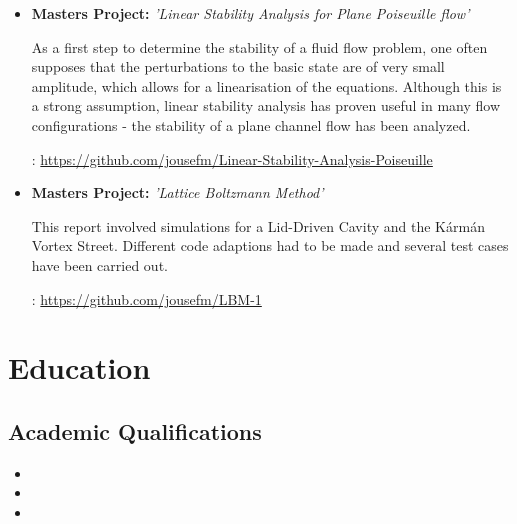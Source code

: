 \documentclass[11pt,a4paper,sans]{moderncv}        %
\begin{document}
\vspace{5pt}

\begin{itemize}

\item{\textbf{Masters Project:} \textit{'Linear Stability Analysis for Plane Poiseuille flow'}

\vspace{3pt}

\small{As a first step to determine the stability of a fluid flow problem, one often supposes that the perturbations to the basic state are of very small amplitude, which allows for a linearisation of the equations. Although this is a strong assumption, linear stability analysis has proven useful in many flow configurations - the stability of a plane channel flow has been analyzed.}} \newline

\faGithub : \url{https://github.com/jousefm/Linear-Stability-Analysis-Poiseuille} \newline

\item{\textbf{Masters Project:}} \textit{'Lattice Boltzmann Method'}

\vspace{3pt}

\small{This report involved simulations for a Lid-Driven Cavity and the Kármán Vortex Street. Different code adaptions had to be made and several test cases have been carried out. } \newline

\faGithub : \url{https://github.com/jousefm/LBM-1}

\end{itemize}

\section{Education}

\vspace{6pt}

\subsection{Academic Qualifications}

\vspace{5pt}

\begin{itemize}

\item{}

\item{}

\item{}  %

\end{itemize}
\end{document}
